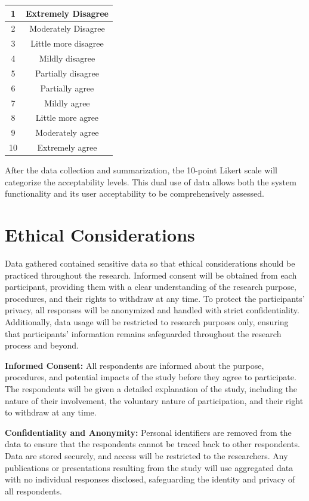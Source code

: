 	\begin{table}[h]
		\centering
		\begin{tabular}{|c|c|}
			\hline
			1  & Extremely Disagree   \\ \hline
			2  & Moderately Disagree  \\ \hline
			3  & Little more disagree \\ \hline
			4  & Mildly disagree      \\ \hline
			5  & Partially disagree   \\ \hline
			6  & Partially agree      \\ \hline
			7  & Mildly agree         \\ \hline
			8  & Little more agree    \\ \hline
			9  & Moderately agree     \\ \hline
			10 & Extremely agree      \\ \hline
		\end{tabular}
	\end{table}
	
	After the data collection and summarization, the 10-point Likert scale will categorize the acceptability levels. This dual use of data allows both the system functionality and its user acceptability to be comprehensively assessed. 

\section{Ethical Considerations}
	Data gathered contained sensitive data so that ethical considerations should be practiced throughout the research.  Informed consent will be obtained from each participant, providing them with a clear understanding of the research purpose, procedures, and their rights to withdraw at any time. To protect the participants’ privacy, all responses will be anonymized and handled with strict confidentiality. Additionally, data usage will be restricted to research purposes only, ensuring that participants' information remains safeguarded throughout the research process and beyond. 
	
	\textbf{Informed Consent:} All respondents are informed about the purpose, procedures, and potential impacts of the study before they agree to participate. The respondents will be given a detailed explanation of the study, including the nature of their involvement, the voluntary nature of participation, and their right to withdraw at any time.
	
	\textbf{Confidentiality and Anonymity:} Personal identifiers are removed from the data to ensure that the respondents cannot be traced back to other respondents. Data are stored securely, and access will be restricted to the researchers. Any publications or presentations resulting from the study will use aggregated data with no individual responses disclosed, safeguarding the identity and privacy of all respondents.
	
